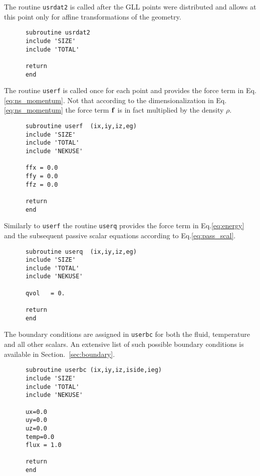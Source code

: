 The routine {\tt usrdat2} is called after the GLL points were distributed and allows at this point only for affine transformations of the geometry.
\begin{lstlisting}
      subroutine usrdat2
      include 'SIZE'
      include 'TOTAL'

      return
      end
\end{lstlisting}

The routine {\tt userf} is called once for each point and provides the force term in Eq.\ref{eq:ns_momentum}. Not that according to the dimensionalization in Eq.\ref{eq:ns_momentum} the force term \(\mathbf{f}\) is in fact multiplied by the density \(\rho\).
\begin{lstlisting}
      subroutine userf  (ix,iy,iz,eg)
      include 'SIZE'
      include 'TOTAL'
      include 'NEKUSE'

      ffx = 0.0
      ffy = 0.0
      ffz = 0.0

      return
      end
\end{lstlisting}

Similarly to {\tt userf} the routine {\tt userq} provides the force term in Eq.\ref{eq:energy} and the subsequent passive scalar equations according to Eq.\ref{eq:pass_scal}.
\begin{lstlisting}	
      subroutine userq  (ix,iy,iz,eg)
      include 'SIZE'
      include 'TOTAL'
      include 'NEKUSE'
      
      qvol   = 0.

      return
      end
      \end{lstlisting}
      
      The boundary conditions are assigned in {\tt userbc} for both the fluid, temperature and all other scalars. An extensive list of such possible boundary conditions is available in Section.~\ref{sec:boundary}. 
      \begin{lstlisting}
      subroutine userbc (ix,iy,iz,iside,ieg)
      include 'SIZE'
      include 'TOTAL'
      include 'NEKUSE'

      ux=0.0
      uy=0.0
      uz=0.0
      temp=0.0
      flux = 1.0
      
      return
      end
\end{lstlisting}

